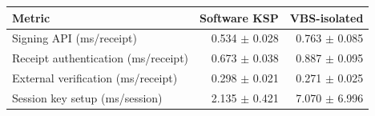 \begin{tabular}{lrr}
\toprule
Metric & Software KSP & VBS-isolated \\
\midrule
Signing API (ms/receipt) & 0.534 $\pm$ 0.028 & 0.763 $\pm$ 0.085 \\
Receipt authentication (ms/receipt) & 0.673 $\pm$ 0.038 & 0.887 $\pm$ 0.095 \\
External verification (ms/receipt) & 0.298 $\pm$ 0.021 & 0.271 $\pm$ 0.025 \\
Session key setup (ms/session) & 2.135 $\pm$ 0.421 & 7.070 $\pm$ 6.996 \\
\bottomrule
\end{tabular}
